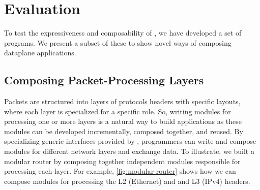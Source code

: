 \documentclass[letterpaper,twocolumn,10pt]{article}
\begin{document}
\section{Evaluation}
\label{sec:evaluation}
To test the expressiveness and composability of \ulang, we have
developed a set of \ulang programs. We present a subset of
these to show novel ways of composing dataplane applications.

\subsection{Composing Packet-Processing Layers}
\label{subsection:composing-packet-processing-layers}
Packets are structured into layers of protocols headers with specific
layouts, where each layer is specialized for a specific role.  So,
writing modules for processing one or more layers is a natural way to
build applications as these modules can be developed incrementally,
composed together, and reused.
By specializing generic interfaces provided by \uarch, 
programmers can write and compose \ulang modules for different
network layers and exchange data.
To illustrate, we
built a modular router by composing together independent modules
responsible for processing each layer. For example,
\cref{fig:modular-router} shows how we can compose modules for
processing the L2 (Ethernet) and and L3 (IPv4) headers.
\end{document}
